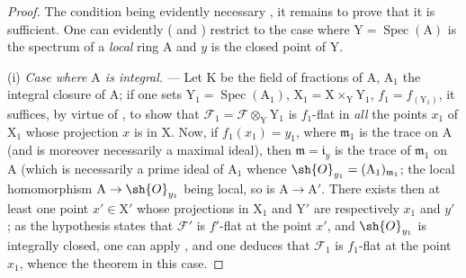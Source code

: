 \begin{proof}
The condition being evidently necessary , it remains to prove that it is sufficient.
One can evidently ( and ) restrict to the case where $\mathrm{Y}=\operatorname{Spec}(\mathrm{A})$ is the spectrum of a \emph{local} ring $\mathrm{A}$ and $y$ is the closed point of $\mathrm{Y}$.
\medskip

(i) \emph{Case where $\mathrm{A}$ is integral.} --- Let $\mathrm{K}$ be the field of fractions of $\mathrm{A}$, $\mathrm{A}_1$ the integral closure of $\mathrm{A}$; if one sets $\mathrm{Y}_1=\operatorname{Spec}(\mathrm{A}_1)$, $\mathrm{X}_1=\mathrm{X}\times_\mathrm{Y}\mathrm{Y}_1$, $f_1=f_{(\mathrm{Y}_1)}$, it suffices, by virtue of , to show that $\mathscr{F}_1=\mathscr{F}\otimes_\mathrm{Y}\mathrm{Y}_1$ is $f_1$-flat in \emph{all} the points $x_1$ of $\mathrm{X}_1$ whose projection $x$ is in $\mathrm{X}$.
Now, if $f_1(x_1)=y_1$, where $\mathfrak{m}_1$ is the trace on $\mathrm{A}$ (and is moreover necessarily a maximal ideal), then $\mathfrak{m}=\mathfrak{i}_y$ is the trace of $\mathfrak{m}_1$ on $\mathrm{A}$ (which is necessarily a prime ideal of $\mathrm{A}_1$ whence $\sh{O}_{y_1}=(\mathrm{A}_1)_{\mathfrak{m}_1}$; the local homomorphism $\mathrm{A}\to\sh{O}_{y_1}$ being local, so is $\mathrm{A}\to\mathrm{A}'$.
There exists then at least one
point $x'\in\mathrm{X}'$ whose projections in $\mathrm{X}_1$ and $\mathrm{Y}'$ are respectively $x_1$ and $y'$ ; as the hypothesis states that $\mathscr{F}'$ is $f'$-flat at the point $x'$, and $\sh{O}_{y_1}$ is integrally closed, one can apply , and one deduces that $\mathscr{F}_1$ is $f_1$-flat at the point $x_1$, whence the theorem in this case.
\medskip


\end{proof}
